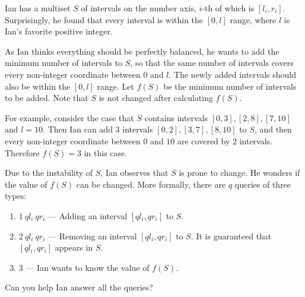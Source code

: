 Ian has a multiset $S$ of intervals on the number axis, $i$-th of which is $[l_i,r_i]$.
Surprisingly, he found that every interval is within the $[0,l]$ range, where $l$ is Ian's favorite positive integer.

As Ian thinks everything should be perfectly balanced, he wants to add the minimum number of intervals to $S$, so that the same number of intervals covers every non-integer coordinate between $0$ and $l$.
The newly added intervals should also be within the $[0,l]$ range.
Let $f(S)$ be the minimum number of intervals to be added.
Note that $S$ is not changed after calculating $f(S)$.

For example, consider the case that $S$ contains intervals $[0,3], [2,8], [7,10]$ and $l=10$.
Then Ian can add $3$ intervals $[0,2],[3,7],[8,10]$ to $S$, and then every non-integer coordinate between $0$ and $10$ are covered by $2$ intervals.
Therefore $f(S) = 3$ in this case.

Due to the instability of $S$, Ian observes that $S$ is prone to change.
He wonders if the value of $f(S)$ can be changed.
More formally, there are $q$ queries of three types:

\begin{enumerate}
\item $1\ ql_i\ qr_i$ — Adding an interval $[ql_i,qr_i]$ to $S$.
\item $2\ ql_i\ qr_i$ — Removing an interval $[ql_i,qr_i]$ to $S$. It is guaranteed that $[ql_i,qr_i]$ appears in $S$.
\item $3$ — Ian wants to know the value of $f(S)$.
\end{enumerate}

Can you help Ian answer all the queries?